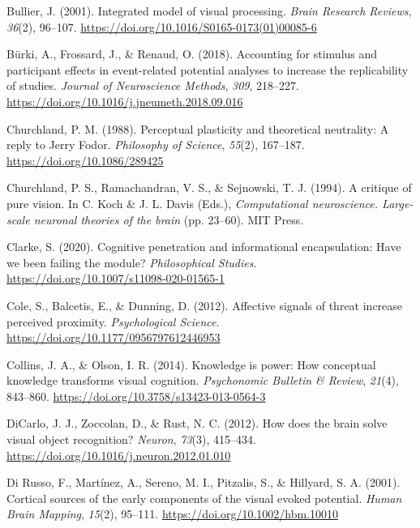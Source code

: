 \documentclass[
  english,
  man,floatsintext]{apa7}
\begin{document}
\leavevmode\hypertarget{ref-bullier2001}{}%
Bullier, J. (2001). Integrated model of visual processing. \emph{Brain Research Reviews}, \emph{36}(2), 96--107. \url{https://doi.org/10.1016/S0165-0173(01)00085-6}

\leavevmode\hypertarget{ref-buxfcrki2018}{}%
Bürki, A., Frossard, J., \& Renaud, O. (2018). Accounting for stimulus and participant effects in event-related potential analyses to increase the replicability of studies. \emph{Journal of Neuroscience Methods}, \emph{309}, 218--227. \url{https://doi.org/10.1016/j.jneumeth.2018.09.016}

\leavevmode\hypertarget{ref-churchland1988}{}%
Churchland, P. M. (1988). Perceptual plasticity and theoretical neutrality: A reply to Jerry Fodor. \emph{Philosophy of Science}, \emph{55}(2), 167--187. \url{https://doi.org/10.1086/289425}

\leavevmode\hypertarget{ref-churchland1994}{}%
Churchland, P. S., Ramachandran, V. S., \& Sejnowski, T. J. (1994). A critique of pure vision. In C. Koch \& J. L. Davis (Eds.), \emph{Computational neuroscience. Large-scale neuronal theories of the brain} (pp. 23--60). MIT Press.

\leavevmode\hypertarget{ref-clarke2020}{}%
Clarke, S. (2020). Cognitive penetration and informational encapsulation: Have we been failing the module? \emph{Philosophical Studies}. \url{https://doi.org/10.1007/s11098-020-01565-1}

\leavevmode\hypertarget{ref-cole2012}{}%
Cole, S., Balcetis, E., \& Dunning, D. (2012). Affective signals of threat increase perceived proximity. \emph{Psychological Science}. \url{https://doi.org/10.1177/0956797612446953}

\leavevmode\hypertarget{ref-collins2014}{}%
Collins, J. A., \& Olson, I. R. (2014). Knowledge is power: How conceptual knowledge transforms visual cognition. \emph{Psychonomic Bulletin \& Review}, \emph{21}(4), 843--860. \url{https://doi.org/10.3758/s13423-013-0564-3}

\leavevmode\hypertarget{ref-dicarlo2012}{}%
DiCarlo, J. J., Zoccolan, D., \& Rust, N. C. (2012). How does the brain solve visual object recognition? \emph{Neuron}, \emph{73}(3), 415--434. \url{https://doi.org/10.1016/j.neuron.2012.01.010}

\leavevmode\hypertarget{ref-dirusso2001}{}%
Di Russo, F., Martínez, A., Sereno, M. I., Pitzalis, S., \& Hillyard, S. A. (2001). Cortical sources of the early components of the visual evoked potential. \emph{Human Brain Mapping}, \emph{15}(2), 95--111. \url{https://doi.org/10.1002/hbm.10010}
\end{document}

